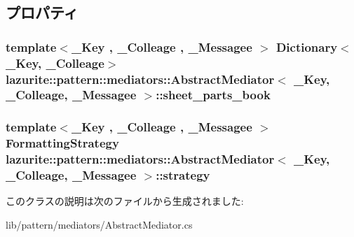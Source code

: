 \subsection{プロパティ}
\hypertarget{classlazurite_1_1pattern_1_1mediators_1_1_abstract_mediator_3_01___key_00_01___colleage_00_01___messagee_01_4_acd05162b89cdf5daa2cf8b82b0e9ae73}{
\subsubsection[{sheet\_\-parts\_\-book}]{\setlength{\rightskip}{0pt plus 5cm}template$<$\_\-Key , \_\-Colleage , \_\-Messagee $>$ Dictionary$<$\_\-Key, \_\-Colleage$>$ lazurite::pattern::mediators::AbstractMediator$<$ \_\-Key, \_\-Colleage, \_\-Messagee $>$::sheet\_\-parts\_\-book}}
\label{classlazurite_1_1pattern_1_1mediators_1_1_abstract_mediator_3_01___key_00_01___colleage_00_01___messagee_01_4_acd05162b89cdf5daa2cf8b82b0e9ae73}
\hypertarget{classlazurite_1_1pattern_1_1mediators_1_1_abstract_mediator_3_01___key_00_01___colleage_00_01___messagee_01_4_a8106939ab4566b09e7032356d48eadff}{
\subsubsection[{strategy}]{\setlength{\rightskip}{0pt plus 5cm}template$<$\_\-Key , \_\-Colleage , \_\-Messagee $>$ FormattingStrategy lazurite::pattern::mediators::AbstractMediator$<$ \_\-Key, \_\-Colleage, \_\-Messagee $>$::strategy}}
\label{classlazurite_1_1pattern_1_1mediators_1_1_abstract_mediator_3_01___key_00_01___colleage_00_01___messagee_01_4_a8106939ab4566b09e7032356d48eadff}


このクラスの説明は次のファイルから生成されました:\begin{DoxyCompactItemize}
\item 
lib/pattern/mediators/AbstractMediator.cs\end{DoxyCompactItemize}
